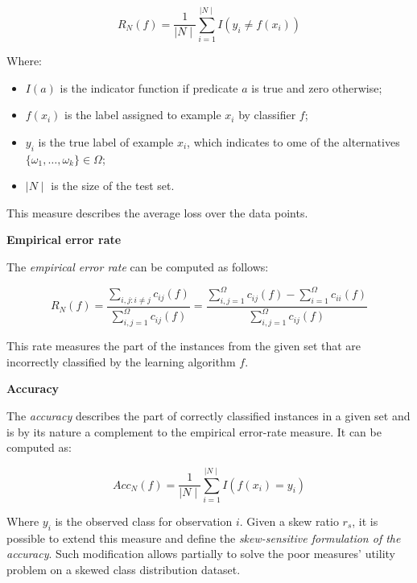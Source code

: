 \documentclass[12pt,]{article}
\providecommand{\tightlist}{%
  \setlength{\itemsep}{0pt}\setlength{\parskip}{0pt}}
\begin{document}
\begin{equation}
R_{N} (f) = \frac{1}{\mid N \mid} \sum_{i = 1}^{\mid N \mid} I (y_i \neq f (x_i))
\end{equation}

Where:

\begin{itemize}
\tightlist
\item
  \(I(a)\) is the indicator function if predicate \(a\) is true and zero
  otherwise;
\item
  \(f(x_i)\) is the label assigned to example \(x_i\) by classifier
  \(f\);
\item
  \(y_i\) is the true label of example \(x_i\), which indicates to ome
  of the alternatives \(\{\omega_1, \dots, \omega_k\} \in \Omega\);
\item
  \(\mid N \mid\) is the size of the test set.
\end{itemize}

This measure describes the average loss over the data points.

\textbf{Empirical error rate}

The \emph{empirical error rate} can be computed as follows:

\begin{equation}
R_N (f) = \frac
    {\sum_{i, j: i \neq j} c_{ij} (f)}
    {\sum_{i,j = 1}^{\Omega} c_{ij} (f)} =
  \frac
    {\sum_{i,j = 1}^{\Omega} c_{ij} (f) - \sum_{i = 1}^{\Omega} c_{ii} (f)}
    {\sum_{i,j = 1}^{\Omega} c_{ij} (f)}
\end{equation}

This rate measures the part of the instances from the given set that are
incorrectly classified by the learning algorithm \(f\).

\textbf{Accuracy}

The \emph{accuracy} describes the part of correctly classified instances
in a given set and is by its nature a complement to the empirical
error-rate measure. It can be computed as:

\begin{equation}
Acc_N (f) = \frac{1}{\mid N \mid} \sum_{i = 1}^{\mid N \mid} I (f (x_i) = y_i)
\end{equation}

Where \(y_i\) is the observed class for observation \(i\). Given a skew
ratio \(r_s\), it is possible to extend this measure and define the
\emph{skew-sensitive formulation of the accuracy}. Such modification
allows partially to solve the poor measures' utility problem on a skewed
class distribution dataset.
\end{document}
